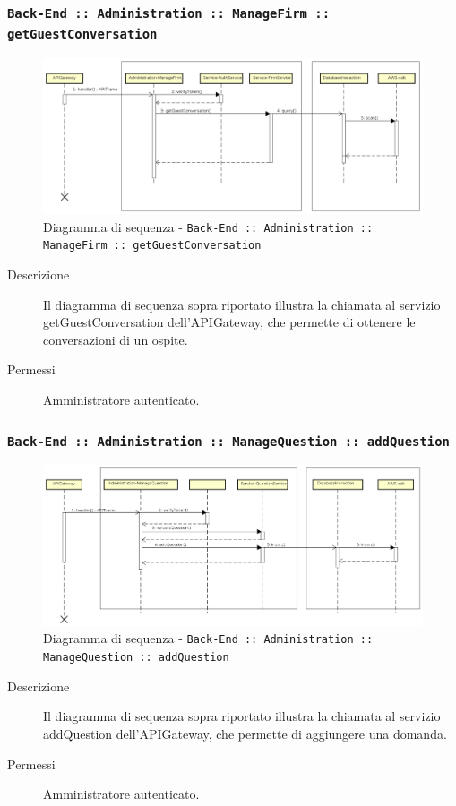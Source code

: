 \documentclass[../DefinizioneDiProdotto_v3.0.0.tex]{subfiles}
\begin{document}
\newpage
\subsubsection{\texttt{Back-End :: Administration :: ManageFirm :: getGuestConversation}}
\begin{figure}[!h]
	\centering
	\includegraphics[width=\textwidth]{DiagrammiSequenza/Back-End/manageFirm/getGuestConversation.png}
	\caption{Diagramma di sequenza - \texttt{Back-End :: Administration :: ManageFirm :: getGuestConversation }}
\end{figure}
\begin{description}
	\item [Descrizione] Il diagramma di sequenza sopra riportato illustra la chiamata al servizio getGuestConversation dell'APIGateway, che permette di ottenere le conversazioni di un ospite.
	\item [Permessi] Amministratore autenticato.
\end{description}

\subsubsection{\texttt{Back-End :: Administration :: ManageQuestion :: addQuestion}}
\begin{figure}[!h]
	\centering
	\includegraphics[width=\textwidth]{DiagrammiSequenza/Back-End/manageQuestion/addQuestion.png}
	\caption{Diagramma di sequenza - \texttt{Back-End :: Administration :: ManageQuestion :: addQuestion }}
\end{figure}
\begin{description}
	\item [Descrizione] Il diagramma di sequenza sopra riportato illustra la chiamata al servizio addQuestion dell'APIGateway, che permette di aggiungere una domanda.
	\item [Permessi] Amministratore autenticato.
\end{description}
\end{document}
